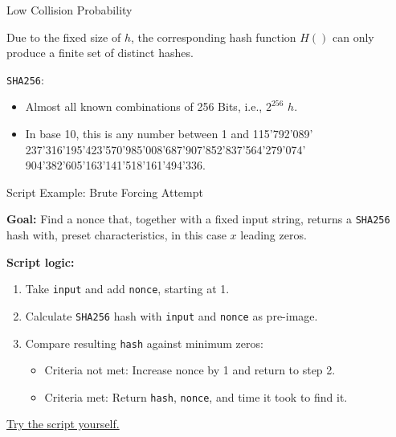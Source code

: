 \documentclass[]{beamer}
\begin{document}
\begin{frame}{Low Collision Probability}

Due to the fixed size of $h$, the corresponding hash function $H()$ can only produce a finite set of distinct hashes.
\vspace{1em}

\texttt{SHA256}:
	\begin{itemize}
		\item Almost all known combinations of 256 Bits, i.e.,  $2^{256}$ $h$.
		\item In base 10, this is any number between 1 and 115'792'089' 237'316'195'423'570'985'008'687'907’852'837'564'279'074' 904'382'605'163'141'518'161'494'336.
	\end{itemize}
\vspace{1em}


	
\end{frame}

\begin{frame}{Script Example: Brute Forcing Attempt}

\textbf{Goal:} Find a nonce that, together with a fixed input string, returns a \texttt{SHA256} hash with, preset characteristics, in this case $x$ leading zeros.

\vspace{1em}

\textbf{Script logic:}
\begin{enumerate}
	\item Take \texttt{input} and add \texttt{nonce}, starting at 1.
	\item Calculate \texttt{SHA256} hash with \texttt{input} and \texttt{nonce} as pre-image.
	\item Compare resulting \texttt{hash} against minimum zeros:
	\begin{itemize}
		\item Criteria not met: Increase nonce by 1 and  return to step 2.
		\item Criteria met: Return \texttt{hash}, \texttt{nonce}, and time it took to find it.
	\end{itemize} 
\end{enumerate}

\vspace{1em}

\color{focus} \link \href {}{Try the script yourself.}
	
\end{frame}
\end{document}
